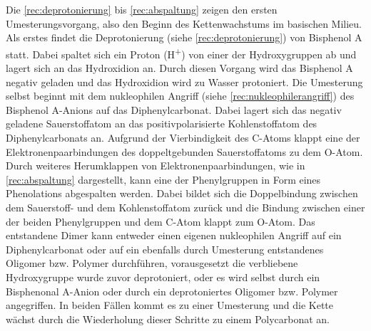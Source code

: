 Die \autoref{rec:deprotonierung} bis \autoref{rec:abspaltung} zeigen den ersten
Umesterungsvorgang, also den Beginn des Kettenwachstums im basischen Milieu. Als
erstes findet die Deprotonierung (siehe \autoref{rec:deprotonierung}) von
Bisphenol A statt. Dabei spaltet sich ein Proton (H\textsuperscript{+}) von
einer der Hydroxygruppen ab und lagert sich an das Hydroxidion an. Durch diesen
Vorgang wird das Bisphenol A negativ geladen und das Hydroxidion wird zu Wasser
protoniert. Die Umesterung selbst beginnt mit dem nukleophilen Angriff (siehe
\autoref{rec:nukleophilerangriff}) des Bisphenol A-Anions auf das
Diphenylcarbonat. Dabei lagert sich das negativ geladene Sauerstoffatom an das
positivpolarisierte Kohlenstoffatom des Diphenylcarbonats an. Aufgrund der
Vierbindigkeit des C-Atoms \glqq klappt\grqq{} eine der Elektronenpaarbindungen
des doppeltgebunden Sauerstoffatoms zu dem O-Atom. Durch weiteres \glqq
Herumklappen\grqq{} von Elektronenpaarbindungen, wie in \autoref{rec:abspaltung}
dargestellt, kann eine der Phenylgruppen in Form eines Phenolations abgespalten
werden. Dabei bildet sich die Doppelbindung zwischen dem Sauerstoff- und dem
Kohlenstoffatom zurück und die Bindung zwischen einer der beiden Phenylgruppen
und dem C-Atom \glqq klappt\grqq{} zum O-Atom. Das entstandene Dimer kann
entweder einen eigenen nukleophilen Angriff auf ein Diphenylcarbonat oder auf
ein ebenfalls durch Umesterung entstandenes Oligomer bzw. Polymer durchführen,
vorausgesetzt die verbliebene Hydroxygruppe wurde zuvor deprotoniert, oder es
wird selbst durch ein Bisphenonal A-Anion oder durch ein deprotoniertes Oligomer
bzw. Polymer angegriffen. In beiden Fällen kommt es zu einer Umesterung und die
Kette wächst durch die Wiederholung dieser Schritte zu einem Polycarbonat an.

